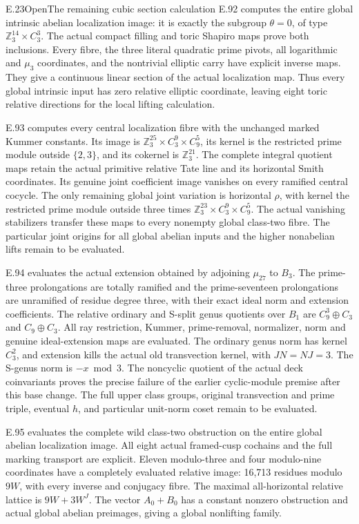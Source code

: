 \begin{statement}{E.23}{Open}{The remaining cubic section calculation}
E.92 computes the entire global intrinsic abelian
localization image: it is exactly the subgroup
\(\theta=0\), of type \(\mathbb Z_3^{14}\times C_3^3\).
The actual compact filling and toric Shapiro maps prove
both inclusions. Every fibre, the three literal quadratic
prime pivots, all logarithmic and \(\mu_3\) coordinates,
and the nontrivial elliptic carry have explicit inverse
maps. They give a continuous linear section of the
actual localization map. Thus every global intrinsic
input has zero relative elliptic coordinate, leaving
eight toric relative directions for the local lifting
calculation.

E.93 computes every central localization fibre with
the unchanged marked Kummer constants. Its image is
\(\mathbb Z_3^{25}\times C_3^9\times C_9^5\), its
kernel is the restricted prime module outside
\(\{2,3\}\), and its cokernel is \(\mathbb Z_3^{21}\).
The complete integral quotient maps retain the actual
primitive relative Tate line and its horizontal Smith
coordinates. Its genuine joint coefficient image
vanishes on every ramified central cocycle. The only
remaining global joint variation is horizontal
\(\rho\), with kernel the restricted prime module
outside three times
\(\mathbb Z_3^{23}\times C_3^9\times C_9^5\).
The actual vanishing stabilizers transfer these maps
to every nonempty global class-two fibre. The particular
joint origins for all global abelian inputs and the
higher nonabelian lifts remain to be evaluated.


E.94 evaluates the actual extension obtained by adjoining
\(\mu_{27}\) to \(B_3\). The prime-three prolongations
are totally ramified and the prime-seventeen prolongations
are unramified of residue degree three, with their exact
ideal norm and extension coefficients. The relative
ordinary and S-split genus quotients over \(B_1\) are
\(C_9^3\oplus C_3\) and \(C_9\oplus C_3\).
All ray restriction, Kummer, prime-removal, normalizer,
norm and genuine ideal-extension maps are evaluated.
The ordinary genus norm has kernel \(C_3^2\), and
extension kills the actual old transvection kernel,
with \(JN=NJ=3\). The S-genus norm is \(-x\bmod3\).
The noncyclic quotient of the actual deck coinvariants
proves the precise failure of the earlier cyclic-module
premise after this base change. The full upper class
groups, original transvection and prime triple, eventual
\(h\), and particular unit-norm coset remain to be evaluated.


E.95 evaluates the complete wild class-two obstruction on
the entire global abelian localization image. All eight
actual framed-cusp cochains and the full marking transport
are explicit. Eleven modulo-three and four modulo-nine
coordinates have a completely evaluated relative image:
16,713 residues modulo \(9W\), with every inverse and
conjugacy fibre. The maximal all-horizontal relative
lattice is \(9W+3W^J\). The vector \(A_0+B_0\) has
a constant nonzero obstruction and actual global abelian
preimages, giving a global nonlifting family.


\end{statement}
